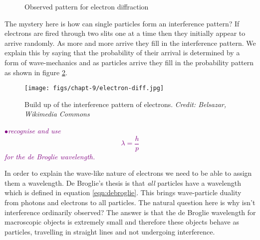 \documentclass[a4paper,11pt,twoside]{memoir}
\newcounter{spec}[chapter]
\newcommand{\spec}[1]{\Needspace{5\baselineskip}\textcolor{purple}{$\bullet$\hspace{0.5cm}\textit{#1}}}
\begin{document}
\begin{figure}[!h]
  \begin{center}
  \end{center}
  \caption{Observed pattern for electron diffraction}
  \label{fig:electron-diff-observed}
\end{figure}

The mystery here is how can single particles form an interference pattern? If electrons are fired through two slits one at a time then they initially appear to arrive randomly. As more and more arrive they fill in the interference pattern. We explain this by saying that the probability of their arrival is determined by a form of wave-mechanics and as particles arrive they fill in the probability pattern as shown in figure \ref{fig:electron-buildup}.

\begin{figure}
  \begin{center}
  \texttt{[image: figs/chapt-9/electron-diff.jpg]}
\end{center}
  \caption{Build up of the interference pattern of electrons. \emph{Credit: Belsazar, Wikimedia Commons}}
  \label{fig:electron-buildup}
\end{figure}

\clearpage

\spec{recognise and use
\begin{equation}\label{eqn:debroglie}
\lambda = \frac{h}{p}
\end{equation} for the de Broglie wavelength.}

In order to explain the wave-like nature of electrons we need to be able to assign them a wavelength. De Broglie's thesis is that \emph{all} particles have a wavelength which is defined in equation \ref{eqn:debroglie}. This brings wave-particle duality from photons and electrons to all particles. The natural question here is why isn't interference ordinarily observed? The answer is that the de Broglie wavelength for macroscopic objects is extremely small and therefore these objects behave as particles, travelling in straight lines and not undergoing interference.
\end{document}
